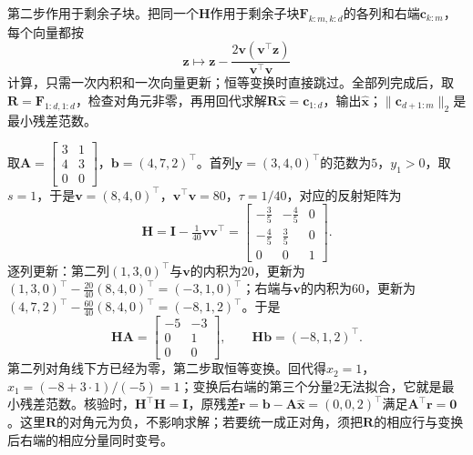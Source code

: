 第二步作用于剩余子块。把同一个$\bm H$作用于剩余子块$\bm F_{k:m,k:d}$的各列和右端$\bm c_{k:m}$，每个向量都按
\[
 \bm z\mapsto\bm z-\frac{2\bm v(\bm v^\top\bm z)}{\bm v^\top\bm v}
\]
计算，只需一次内积和一次向量更新；恒等变换时直接跳过。全部列完成后，取$\bm R=\bm F_{1:d,1:d}$，检查对角元非零，再用回代求解$\bm R\hat{\bm x}=\bm c_{1:d}$，输出$\hat{\bm x}$；$\lVert\bm c_{d+1:m}\rVert_2$是最小残差范数。

\begin{example}[一步反射完成的三角化]
\label{ex:ls-householder-one-step}
取$\bm A=\left[\begin{smallmatrix}3&1\\4&3\\0&0\end{smallmatrix}\right]$，$\bm b=(4,7,2)^\top$。首列$\bm y=(3,4,0)^\top$的范数为$5$，$y_1>0$，取$s=1$，于是$\bm v=(8,4,0)^\top$，$\bm v^\top\bm v=80$，$\tau=1/40$，对应的反射矩阵为
\[
 \bm H=\bm I-\tfrac1{40}\bm v\bm v^\top=\begin{bmatrix}-\tfrac35&-\tfrac45&0\\-\tfrac45&\tfrac35&0\\0&0&1\end{bmatrix}.
\]
逐列更新：第二列$(1,3,0)^\top$与$\bm v$的内积为$20$，更新为$(1,3,0)^\top-\tfrac{20}{40}(8,4,0)^\top=(-3,1,0)^\top$；右端与$\bm v$的内积为$60$，更新为$(4,7,2)^\top-\tfrac{60}{40}(8,4,0)^\top=(-8,1,2)^\top$。于是
\[
 \bm H\bm A=\begin{bmatrix}-5&-3\\0&1\\0&0\end{bmatrix},\qquad \bm H\bm b=(-8,1,2)^\top .
\]
第二列对角线下方已经为零，第二步取恒等变换。回代得$\hat x_2=1$，$\hat x_1=(-8+3\cdot1)/(-5)=1$；变换后右端的第三个分量$2$无法拟合，它就是最小残差范数。核验时，$\bm H^\top\bm H=\bm I$，原残差$\bm r=\bm b-\bm A\hat{\bm x}=(0,0,2)^\top$满足$\bm A^\top\bm r=\bm0$。这里$\bm R$的对角元为负，不影响求解；若要统一成正对角，须把$\bm R$的相应行与变换后右端的相应分量同时变号。
\end{example}

